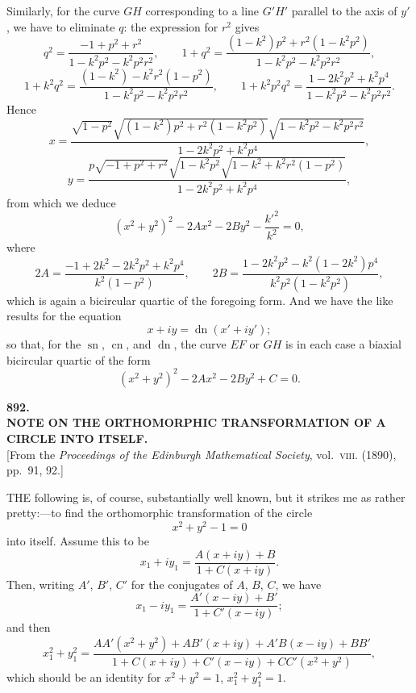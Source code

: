 \documentclass[11pt,a4paper]{article}
\providecommand{\sn}{\operatorname{sn}}
\providecommand{\cn}{\operatorname{cn}}
\providecommand{\dn}{\operatorname{dn}}
\begin{document}
\smallskip
Similarly, for the curve $GH$ corresponding to a line $G'H'$ parallel to the axis of $y'$, we have to eliminate $q$: the expression for $r^2$ gives
\[
q^2 = \frac{-1 + p^2 + r^2}{1 - k^2 p^2 - k^2 p^2 r^2}, \qquad 1 + q^2 = \frac{(1 - k^2)p^2 + r^2(1 - k^2 p^2)}{1 - k^2 p^2 - k^2 p^2 r^2},
\]
\[
1 + k^2 q^2 = \frac{(1 - k^2) - k^2 r^2(1 - p^2)}{1 - k^2 p^2 - k^2 p^2 r^2}, \qquad 1 + k^2 p^2 q^2 = \frac{1 - 2k^2 p^2 + k^2 p^4}{1 - k^2 p^2 - k^2 p^2 r^2}.
\]
Hence
\[
x = \frac{\sqrt{1 - p^2}\sqrt{(1 - k^2)p^2 + r^2(1 - k^2 p^2)}\sqrt{1 - k^2 p^2 - k^2 p^2 r^2}}{1 - 2k^2 p^2 + k^2 p^4},
\]
\[
y = \frac{p\sqrt{-1 + p^2 + r^2}\sqrt{1 - k^2 p^2}\sqrt{1 - k^2 + k^2 r^2(1 - p^2)}}{1 - 2k^2 p^2 + k^2 p^4},
\]
from which we deduce
\[
(x^2 + y^2)^2 - 2Ax^2 - 2By^2 - \frac{k'^2}{k^2} = 0,
\]
where
\[
2A = \frac{-1 + 2k^2 - 2k^2 p^2 + k^2 p^4}{k^2(1 - p^2)}, \qquad 2B = \frac{1 - 2k^2 p^2 - k^2(1 - 2k^2)p^4}{k^2 p^2(1 - k^2 p^2)},
\]
which is again a bicircular quartic of the foregoing form. And we have the like results for the equation
\[
x + iy = \dn(x' + iy');
\]
so that, for the $\sn$, $\cn$, and $\dn$, the curve $EF$ or $GH$ is in each case a biaxial bicircular quartic of the form
\[
(x^2 + y^2)^2 - 2Ax^2 - 2By^2 + C = 0.
\]

\bigskip

\clearpage
\begin{center}
{\large\bfseries 892.}\\[0.5em]
{\large\bfseries NOTE ON THE ORTHOMORPHIC TRANSFORMATION OF A CIRCLE INTO ITSELF.}\\[0.5em]
\small [From the \emph{Proceedings of the Edinburgh Mathematical Society}, vol.\ \textsc{viii}. (1890), pp.\ 91, 92.]
\end{center}
\medskip

THE following is, of course, substantially well known, but it strikes me as rather pretty:---to find the orthomorphic transformation of the circle
\[
x^2 + y^2 - 1 = 0
\]
into itself. Assume this to be
\[
x_1 + iy_1 = \frac{A(x + iy) + B}{1 + C(x + iy)}.
\]
Then, writing $A'$, $B'$, $C'$ for the conjugates of $A$, $B$, $C$, we have
\[
x_1 - iy_1 = \frac{A'(x - iy) + B'}{1 + C'(x - iy)};
\]
and then
\[
x_1^2 + y_1^2 = \frac{AA'(x^2 + y^2) + AB'(x + iy) + A'B(x - iy) + BB'}{1 + C(x + iy) + C'(x - iy) + CC'(x^2 + y^2)},
\]
which should be an identity for $x^2 + y^2 = 1$, $x_1^2 + y_1^2 = 1$.
\end{document}
